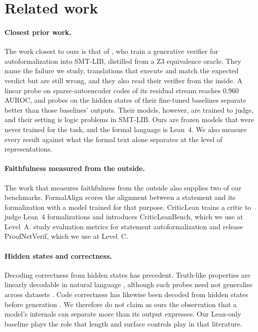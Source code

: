 \documentclass[10pt]{article}
\begin{document}
\section{Related work}

\paragraph{Closest prior work.}
The work closest to ours is that of \citet{genv}, who train a generative verifier for autoformalization into
SMT-LIB, distilled from a Z3 equivalence oracle. They name the failure we study, translations that execute and
match the expected verdict but are still wrong, and they also read their verifier from the inside. A linear probe
on sparse-autoencoder codes of its residual stream reaches 0.960 AUROC, and probes on the hidden states of their
fine-tuned baselines separate better than those baselines' outputs. Their models, however, are trained to judge,
and their setting is logic problems in SMT-LIB. Ours are frozen models that were never trained for the task, and
the formal language is Lean~4. We also measure every result against what the formal text alone separates at the
level of representations.

\paragraph{Faithfulness measured from the outside.}
The work that measures faithfulness from the outside also supplies two of our benchmarks.
FormalAlign \citep{formalalign} scores the alignment between a statement and its formalization with a model trained
for that purpose. CriticLean \citep{criticlean} trains a critic to judge Lean~4 formalizations and introduces
CriticLeanBench, which we use at Level~A. \citet{proofnetverif} study evaluation metrics for statement
autoformalization and release ProofNetVerif, which we use at Level~C.

\paragraph{Hidden states and correctness.}
Decoding correctness from hidden states has precedent. Truth-like properties are linearly decodable in natural
language \citep{geometry}, although such probes need not generalise across datasets \citep{orgad}. Code correctness
has likewise been decoded from hidden states before generation \citep{dicicco}. We therefore do not claim as ours
the observation that a model's internals can separate more than its output expresses. Our Lean-only baseline plays
the role that length and surface controls play in that literature.
\end{document}
